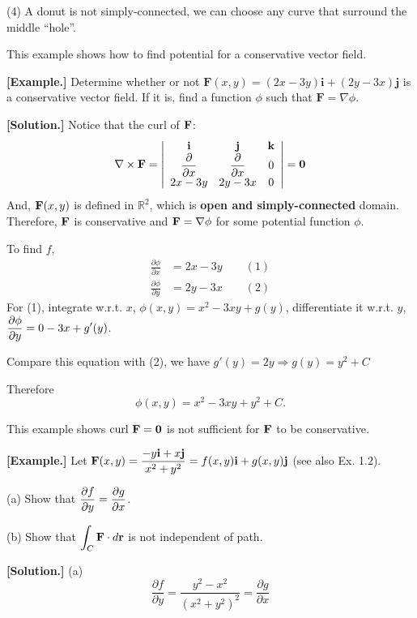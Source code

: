 \documentclass[11pt, a4paper]{MATH2023}
\newcommand{\eg}{\textbf{[Example.] }}
\newcommand{\sol}{\textbf{[Solution.] }}
\newcommand{\ii}{{\bf i}}
\newcommand{\jj}{{\bf j}}
\newcommand{\kk}{{\bf k}}
\newcommand{\FF}{{\bf F}}
\newcommand{\curl}{{\rm curl\ }}
\newcommand{\pt}{\partial}
\begin{document}
\begin{spacing}{1.3}
    (4) A donut is not simply-connected, we can choose any curve that surround the middle ``hole''.


    {\blue This example shows how to find potential for a conservative vector field.}

    \eg Determine whether or not $\mathbf{F}(x, y)=(2 x-3 y) \mathbf{i}+(2 y-3 x) \mathbf{j}$ 
    is a conservative vector field. If it is, find a function $\phi$ such that $\mathbf{F}=\nabla \phi$.

    \sol Notice that the curl of $\FF$:
    $$\nabla \times \FF=\left|\begin{array}{ccc}
        \ii & \jj & \kk \\
        \dfrac{\pt}{\pt x} & \dfrac{\pt}{\pt x} & 0\\
        2x-3y & 2y-3x & 0
    \end{array} \right|={\bf 0}$$
    And, $\FF(x,y)$ is defined in $\mathbb{R}^2$, which is {\bf open and simply-connected} domain.
    Therefore, $\FF$ is conservative and $\FF=\nabla \phi$ for some potential function $\phi$.

    To find $f$,
    \begin{align*}
        \frac{\pt \phi}{\pt x} &= 2x-3y\qquad (1)\\
        \frac{\pt \phi}{\pt y} &= 2y-3x\qquad (2)
    \end{align*}
    For (1), integrate w.r.t. $x$, $\phi(x,y)=x^2-3xy+g(y)$, differentiate it w.r.t. $y$,
    $\disp \frac{\pt \phi}{\pt y}=0-3x+g'(y)$.

    Compare this equation with (2), we have $g'(y)=2y \Rightarrow g(y)=y^2+C$

    Therefore $$\phi(x, y)=x^2-3xy+y^2+C.$$

    \newpage
    {\blue This example shows $\curl \FF={\bf 0}$ is not sufficient for $\FF$ to be conservative.}

    \eg Let $\displaystyle \mathbf{F}(x, y)=\frac{-y \mathbf{i}+x \mathbf{j}}{x^{2}+y^{2}}=f(x, y) \mathbf{i}+g(x, y) \mathbf{j}$ (see also Ex. 1.2).
    
    (a) Show that $\displaystyle \frac{\partial f}{\partial y}=\frac{\partial g}{\partial x}$.

    (b) Show that $\displaystyle \int_{C} \mathbf{F} \cdot d \mathbf{r}$ is not independent of path.
    
    \sol (a)$$\frac{\partial f}{\partial y}=\frac{y^{2}-x^{2}}{\left(x^{2}+y^{2}\right)^{2}}=\frac{\partial g}{\partial x}$$


\end{spacing}
\end{document}
